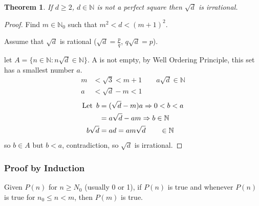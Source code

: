 \documentclass[12pt]{article}
\theoremstyle{plain}
\newtheorem{theorem}{Theorem}[subsection]
\begin{document}
        \begin{theorem}
            If $d\geq 2$, $d\in\mathbb{N}$ is not a perfect square 
            then $\sqrt d$ is irrational.
        \end{theorem}
        \begin{proof}
            Find $m \in \mathbb{N}_0$ such that $m^2 < d < (m+1)^2$.
            
            Assume that $\sqrt d$ is rational ($\sqrt d = \frac pq$, 
            $q \sqrt d = p$).

            let $A = \{n \in \mathbb{N} : n\sqrt d \in \mathbb{N}\}$. 
            A is not empty, by Well Ordering Principle, this set
            has a smallest number $a$. 
            \begin{align*}
                m &< \sqrt 3 < m+1 \qquad a\sqrt d \in \mathbb{N} \\
                a & < \sqrt d - m < 1
            \end{align*}
            \begin{align*}
                \text{Let\,\,\,} 
                b &= (\sqrt d - m) a \Rightarrow 0 < b < a\\
                &=a\sqrt d - am  \Rightarrow b \in \mathbb{N}\\
                b\sqrt d &= ad = am\sqrt d \qquad \in \mathbb{N}
             \end{align*}
            so $b \in A$ but $b < a$, contradiction, 
            so $\sqrt d$ is irrational.
        \end{proof}


        \subsubsection {Proof by Induction}
        Given $P(n)$ for $n\geq N_0$ (usually 0 or 1),
        if  $P(n)$ is true and whenever $P(n)$ is true for $n_0\leq n < m$, 
        then $P(m)$ is true.
\end{document}
